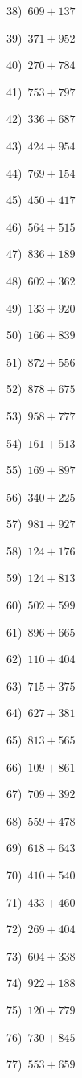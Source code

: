 \documentclass{article}
\begin{document}
\begin{multicols}{2}
38)$\,\,\,609+137$ \par 
39)$\,\,\,371+952$ \par 
40)$\,\,\,270+784$ \par 
41)$\,\,\,753+797$ \par 
42)$\,\,\,336+687$ \par 
43)$\,\,\,424+954$ \par 
44)$\,\,\,769+154$ \par 
45)$\,\,\,450+417$ \par 
46)$\,\,\,564+515$ \par 
47)$\,\,\,836+189$ \par 
48)$\,\,\,602+362$ \par 
49)$\,\,\,133+920$ \par 
50)$\,\,\,166+839$ \par 
51)$\,\,\,872+556$ \par 
52)$\,\,\,878+675$ \par 
53)$\,\,\,958+777$ \par 
54)$\,\,\,161+513$ \par 
55)$\,\,\,169+897$ \par 
56)$\,\,\,340+225$ \par 
57)$\,\,\,981+927$ \par 
58)$\,\,\,124+176$ \par 
59)$\,\,\,124+813$ \par 
60)$\,\,\,502+599$ \par 
61)$\,\,\,896+665$ \par 
62)$\,\,\,110+404$ \par 
63)$\,\,\,715+375$ \par 
64)$\,\,\,627+381$ \par 
65)$\,\,\,813+565$ \par 
66)$\,\,\,109+861$ \par 
67)$\,\,\,709+392$ \par 
68)$\,\,\,559+478$ \par 
69)$\,\,\,618+643$ \par 
70)$\,\,\,410+540$ \par 
71)$\,\,\,433+460$ \par 
72)$\,\,\,269+404$ \par 
73)$\,\,\,604+338$ \par 
74)$\,\,\,922+188$ \par 
75)$\,\,\,120+779$ \par 
76)$\,\,\,730+845$ \par 
77)$\,\,\,553+659$ \par 

\end{multicols}
\end{document}
